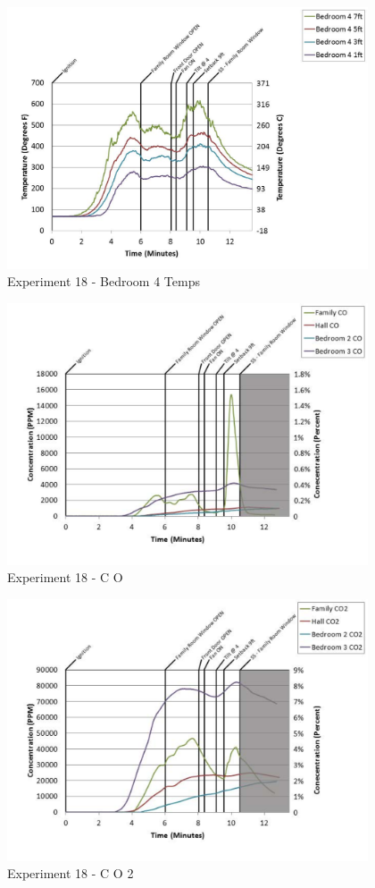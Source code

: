 \documentclass{article}
\begin{document}
\begin{appendices}
	\begin{figure}[h!]
		\centering
		\includegraphics[height=3.05in]{0_Images/Results_Charts/Exp_18_Charts/Bedroom4Temps.pdf}
		\caption{Experiment 18 - Bedroom 4 Temps}
	\end{figure}
 
	\clearpage

	\begin{figure}[h!]
		\centering
		\includegraphics[height=3.05in]{0_Images/Results_Charts/Exp_18_Charts/CO.pdf}
		\caption{Experiment 18 - C O}
	\end{figure}
 

	\begin{figure}[h!]
		\centering
		\includegraphics[height=3.05in]{0_Images/Results_Charts/Exp_18_Charts/CO2.pdf}
		\caption{Experiment 18 - C O 2}
	\end{figure}
 

\end{appendices}
\end{document}
